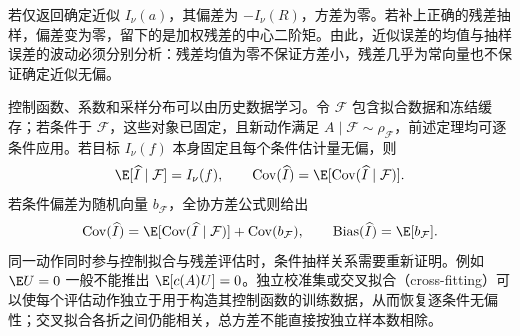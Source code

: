 若仅返回确定近似 $I_\nu(a)$，其偏差为 $-I_\nu(R)$，方差为零。若补上正确的残差抽样，偏差变为零，留下的是加权残差的中心二阶矩。由此，近似误差的均值与抽样误差的波动必须分别分析：残差均值为零不保证方差小，残差几乎为常向量也不保证确定近似无偏。

控制函数、系数和采样分布可以由历史数据学习。令 $\mathcal F$ 包含拟合数据和冻结缓存；若条件于 $\mathcal F$，这些对象已固定，且新动作满足 $A\mid\mathcal F\sim\rho_{\mathcal F}$，前述定理均可逐条件应用。若目标 $I_\nu(f)$ 本身固定且每个条件估计量无偏，则
\[
 \E[\widehat I\mid\mathcal F]=I_\nu(f),\qquad
 \operatorname{Cov}(\widehat I)=\E[\operatorname{Cov}(\widehat I\mid\mathcal F)].
\]
若条件偏差为随机向量 $b_{\mathcal F}$，全协方差公式则给出
\[
 \operatorname{Cov}(\widehat I)
 =\E[\operatorname{Cov}(\widehat I\mid\mathcal F)]+\operatorname{Cov}(b_{\mathcal F}),
 \qquad \operatorname{Bias}(\widehat I)=\E[b_{\mathcal F}].
\]
同一动作同时参与控制拟合与残差评估时，条件抽样关系需要重新证明。例如 $\E U=0$ 一般不能推出 $\E[c(A)U]=0$。独立校准集或交叉拟合（cross-fitting）可以使每个评估动作独立于用于构造其控制函数的训练数据，从而恢复逐条件无偏性；交叉拟合各折之间仍能相关，总方差不能直接按独立样本数相除。
